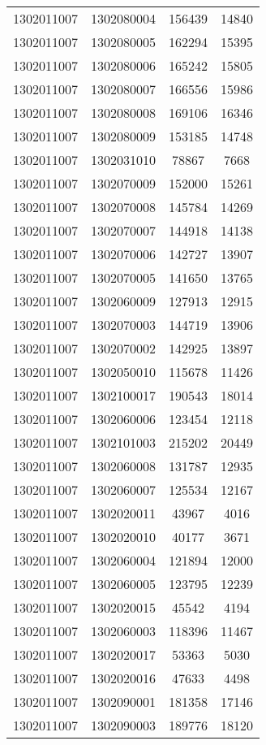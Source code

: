\begin{longtable}[h]{llcc}
		1302011007 & 1302080004 & 156439 & 14840\\
		1302011007 & 1302080005 & 162294 & 15395\\
		1302011007 & 1302080006 & 165242 & 15805\\
		1302011007 & 1302080007 & 166556 & 15986\\
		1302011007 & 1302080008 & 169106 & 16346\\
		1302011007 & 1302080009 & 153185 & 14748\\
		1302011007 & 1302031010 & 78867 & 7668\\
		1302011007 & 1302070009 & 152000 & 15261\\
		1302011007 & 1302070008 & 145784 & 14269\\
		1302011007 & 1302070007 & 144918 & 14138\\
		1302011007 & 1302070006 & 142727 & 13907\\
		1302011007 & 1302070005 & 141650 & 13765\\
		1302011007 & 1302060009 & 127913 & 12915\\
		1302011007 & 1302070003 & 144719 & 13906\\
		1302011007 & 1302070002 & 142925 & 13897\\
		1302011007 & 1302050010 & 115678 & 11426\\
		1302011007 & 1302100017 & 190543 & 18014\\
		1302011007 & 1302060006 & 123454 & 12118\\
		1302011007 & 1302101003 & 215202 & 20449\\
		1302011007 & 1302060008 & 131787 & 12935\\
		1302011007 & 1302060007 & 125534 & 12167\\
		1302011007 & 1302020011 & 43967 & 4016\\
		1302011007 & 1302020010 & 40177 & 3671\\
		1302011007 & 1302060004 & 121894 & 12000\\
		1302011007 & 1302060005 & 123795 & 12239\\
		1302011007 & 1302020015 & 45542 & 4194\\
		1302011007 & 1302060003 & 118396 & 11467\\
		1302011007 & 1302020017 & 53363 & 5030\\
		1302011007 & 1302020016 & 47633 & 4498\\
		1302011007 & 1302090001 & 181358 & 17146\\
		1302011007 & 1302090003 & 189776 & 18120\\

\end{longtable}
